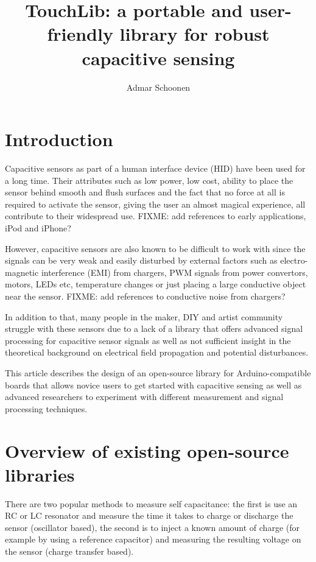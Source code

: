 \documentclass[format=sigchi, screen=true, review=true]{acmart}
\begin{document}


\title{TouchLib: a portable and user-friendly library for robust capacitive sensing}
\author{Admar Schoonen}
\maketitle
\section{Introduction}
Capacitive sensors as part of a human interface device (HID) have been used for
a long time. Their attributes such as low power, low cost, ability to place the
sensor behind smooth and flush surfaces and the fact that no force at all is
required to activate the sensor, giving the user an almost magical experience,
all contribute to their widespread use. FIXME: add references to early
applications, iPod and iPhone?

However, capacitive sensors are also known to be difficult to work with since
the signals can be very weak and easily disturbed by external factors such as
electro-magnetic interference (EMI) from chargers, PWM signals from power
convertors, motors, LEDs etc, temperature changes or just placing a large
conductive object near the sensor. FIXME: add references to conductive noise
from chargers?

In addition to that, many people in the maker, DIY and artist community struggle with
these sensors due to a lack of a library that offers advanced signal processing
for capacitive sensor signals as well as not sufficient insight in the
theoretical background on electrical field propagation and potential
disturbances.

This article describes the design of an open-source library for
Arduino-compatible boards that allows novice users to get started with
capacitive sensing as well as advanced researchers to experiment with different
measurement and signal processing techniques.

\section{Overview of existing open-source libraries}
There are two popular methods to measure self capacitance: the first is use an
RC or LC resonator and measure the time it takes to charge or discharge the
sensor (oscillator based), the second is to inject a known amount of charge
(for example by using a reference capacitor) and measuring the resulting
voltage on the sensor (charge transfer based).
\end{document}
